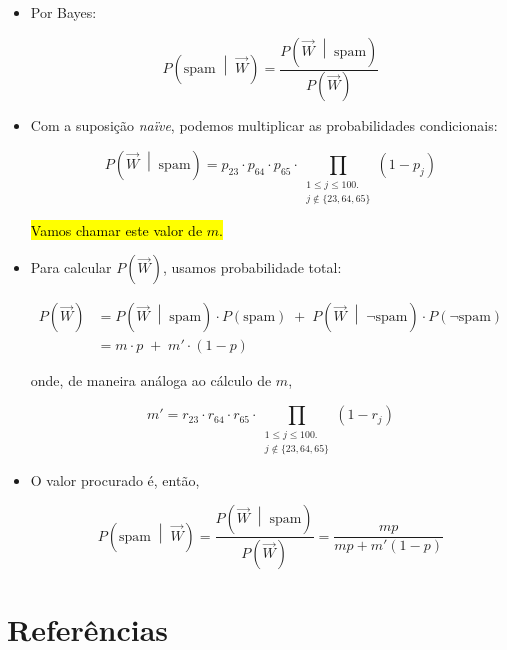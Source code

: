 \documentclass[
  11pt]{report}
\begin{document}
\begin{itemize}
\item
  Por Bayes:

  \[
  P\left( \text{spam} \;\middle|\; \vec W \right) = 
  \frac{P\left(\vec W \;\middle|\; \text{spam} \right)}
  {P\left( \vec W  \right)}
  \]
\item
  Com a suposição \emph{naïve}, podemos multiplicar as probabilidades condicionais:

  \[
  P\left(\vec W\;\middle|\; \text{spam} \right) =
  p_{23} \cdot p_{64} \cdot p_{65} \cdot
  \!\!\!\!\!\!\!\!\!
  \prod_{
    \begin{array}{c}
    1 \leq j \leq 100. \\
    j \not\in \{ 23, 64, 65 \}
    \end{array}
  }
  \!\!\!\!\!\!\!
  (1 - p_j)
  \]

  {\hl{Vamos chamar este valor de $m$.}}
\item
  Para calcular $P\left( \vec W \right)$, usamos probabilidade total:

  \[
  \begin{aligned}
  P\left( \vec W \right) 
  &= 
    P\left(\vec W \;\middle|\; \text{spam} \right) 
    \cdot P(\text{spam})
    \;+\;
    P\left(\vec W \;\middle|\; \neg\text{spam} \right) 
    \cdot P(\neg\text{spam})
  \\
  &=
    m \cdot p \;+\; m' \cdot (1 - p)
  \end{aligned}
  \]

  onde, de maneira análoga ao cálculo de $m$,

  \[
  m' = 
    r_{23} \cdot r_{64} \cdot r_{65} \cdot
  \!\!\!\!\!\!\!\!\!
  \prod_{
    \begin{array}{c}
    1 \leq j \leq 100. \\
    j \not\in \{ 23, 64, 65 \}
    \end{array}
  }
  \!\!\!\!\!\!\!
  (1 - r_j)
  \]
\item
  O valor procurado é, então,

  \[
  P\left( \text{spam} \;\middle|\; \vec W \right) 
  = 
  \frac{P\left(\vec W \;\middle|\; \text{spam} \right)}
  {P\left( \vec W  \right)}
  = \frac{mp}{mp + m'(1 - p)}
  \]
\end{itemize}

\hypertarget{referuxeancias}{%
\chapter*{Referências}\label{referuxeancias}}
\end{document}
